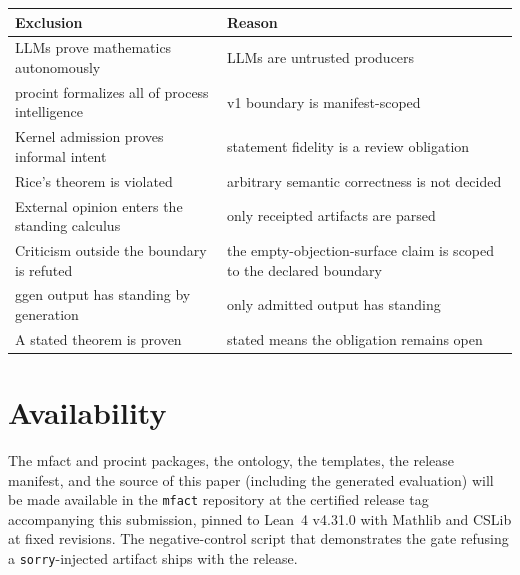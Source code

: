 \documentclass[11pt]{article}
\begin{document}
\begin{center}
\small
\begin{tabular}{ll}
\toprule
Exclusion & Reason \\
\midrule
LLMs prove mathematics autonomously & LLMs are untrusted producers \\
\textsf{procint} formalizes all of process intelligence & v1 boundary is manifest-scoped \\
Kernel admission proves informal intent & statement fidelity is a review obligation \\
Rice's theorem is violated & arbitrary semantic correctness is not decided \\
External opinion enters the standing calculus & only receipted artifacts are parsed \\
Criticism outside the boundary is refuted & the empty-objection-surface claim is scoped to the declared boundary \\
\textsf{ggen} output has standing by generation & only admitted output has standing \\
A stated theorem is proven & stated means the obligation remains open \\
\bottomrule
\end{tabular}
\end{center}

\section{Availability}
\label{sec:availability}

The \textsf{mfact} and \textsf{procint} packages, the ontology, the
templates, the release manifest, and the source of this paper (including
the generated evaluation) will be made available in the \texttt{mfact}
repository at the certified release tag accompanying this submission,
pinned to Lean~4 v4.31.0 with Mathlib and CSLib at fixed revisions. The
negative-control script that demonstrates the gate refusing a
\texttt{sorry}-injected artifact ships with the release.
\end{document}
